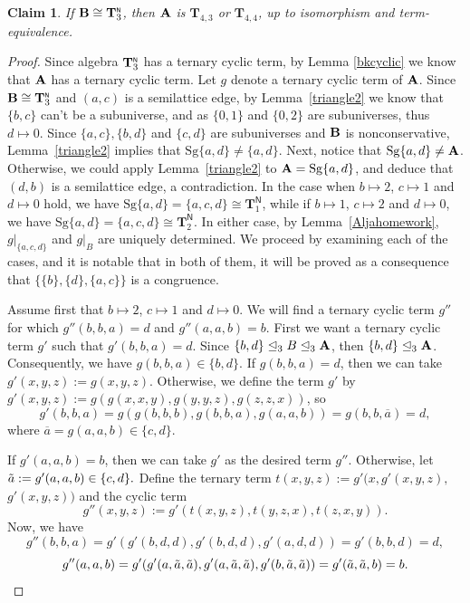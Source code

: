 \documentclass[11pt]{amsart}
\newcommand{\m}[1]{\mathbf{\uppercase{#1}}}
\newcommand{\n}{\scriptscriptstyle{\mathsf{N}}}
\theoremstyle{definition}
\theoremstyle{remark}
\theoremstyle{plain}
\newtheorem{claim}[thm]{Claim}
\def\T{\mathbf{T}}
\begin{document}
\begin{claim}
If ${\m B}\cong {\m T}_3^{\n}$, then ${\m A}$ is ${\T}_{4,3}$ or ${\T}_{4,4}$, up to isomorphism and term-equivalence.
\end{claim}

\begin{proof}
Since algebra ${\m T}_3^{\n}$ has a ternary cyclic term, by Lemma \ref{bkcyclic} we know that $\m A$ has a ternary cyclic term. Let $g$ denote a ternary cyclic term of $\m a$. Since ${\m B}\cong {\m T}_3^{\n}$ and $(a,c)$ is a semilattice edge, by Lemma~\ref{triangle2} we know that $\{b,c\}$ can't be a subuniverse, and as $\{0,1\}$ and $\{0,2\}$ are subuniverses, thus $d\mapsto 0$. Since $\{a,c\}, \{b,d\}$ and $\{c,d\}$ are subuniverses and $\m b$ is nonconservative, Lemma~\ref{triangle2} implies that $\mathrm{Sg}\{a,d\}\neq\{a,d\}$. Next, notice that $\mathrm{Sg}\{a,d\}\not= {\m A}$. Otherwise, we could apply Lemma~\ref{triangle2} to $\m a=\mathrm{Sg}\{a,d\}$, and deduce that $(d,b)$ is a semilattice edge, a contradiction. In the case when $b\mapsto 2$, $c\mapsto 1$ and $d\mapsto 0$ hold, we have $\mathrm{Sg}\{a,d\}=\{a,c,d\}\cong {\T}_1^{\n}$, while if $b\mapsto 1$, $c\mapsto 2$ and $d\mapsto 0$, we have $\mathrm{Sg}\{a,d\}=\{a,c,d\}\cong {\T}_2^{\n}$. In either case,  by Lemma~\ref{Aljahomework}, $g|_{\{a,c,d\}}$ and $g|_B$ are uniquely determined. We proceed by examining each of the cases, and it is notable that in both of them, it will be proved as a consequence that $ \{\{b\},\{d\},\{a,c\}\}$ is a congruence.


Assume first that $b\mapsto 2$, $ c\mapsto 1$ and $d\mapsto 0$. We will find a ternary cyclic term $g''$ for which $g''(b,b,a)=d$ and $g''(a,a,b)=b$. First we want a ternary cyclic term $g'$ such that $g'(b,b,a)=d$. Since $\{b,d\}\trianglelefteq_3 B \trianglelefteq_3 {\m A}$, then $\{b,d\}\trianglelefteq_3 {\m A}$. Consequently, we have $g(b,b,a)\in \{b,d\}$. If $g(b,b,a)=d$, then we can take $g'(x,y,z):=g(x,y,z)$. Otherwise, we define the term $g'$ by $g'(x,y,z):=g(g(x,x,y),g(y,y,z),g(z,z,x))$, so
$$g'(b,b,a)=g(g(b,b,b),g(b,b,a),g(a,a,b))=g(b,b,\overline{a})=d,$$ where  $\overline{a}=g(a,a,b)\in \{c,d\}$.

If $g'(a,a,b)=b$, then we can take $g'$ as the desired term $g''$. Otherwise, let $\Tilde{a}:=g'(a,a,b)\in \{c,d\}.$ Define the ternary term $t(x,y,z):=g'(x,g'(x,y,z),$ $g'(x,y,z))$ and the cyclic term
 $$g''(x,y,z):=g'(t(x,y,z),t(y,z,x),t(z,x,y)).$$
 Now, we have
 $$g''(b,b,a)=g'(g'(b,d,d),g'(b,d,d),g'(a,d,d))=g'(b,b,d)=d,$$
 $$g''(a,a,b)=g'(g'(a,\Tilde{a},\Tilde{a}),g'(a,\Tilde{a},\Tilde{a}),g'(b,\Tilde{a},\Tilde{a}))=g'(\Tilde{a},\Tilde{a},b)=b.$$
 

\end{proof}
\end{document}
